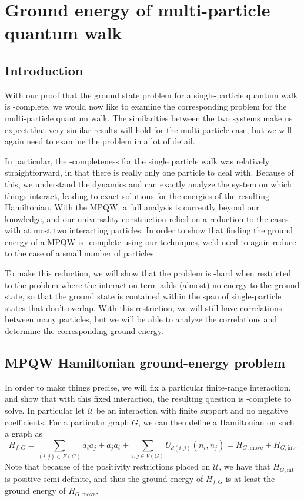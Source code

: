 \documentclass[../thesis-main/thesis-main]{subfiles}
\begin{document}
\chapter{Ground energy of multi-particle quantum walk}
\label{chap:MP_ground}

\section{Introduction}

With our proof that the ground state problem for a single-particle quantum walk is \QMA-complete, we would now like to examine the corresponding problem for the multi-particle quantum walk.  The similarities between the two systems make us expect that very similar results will hold for the multi-particle case, but we will again need to examine the problem in a lot of detail.

In particular, the \QMA-completeness for the single particle walk was relatively straightforward, in that there is really only one particle to deal with.  Because of this, we understand the dynamics and can exactly analyze the system on which things interact, leading to exact solutions for the energies of the resulting Hamiltonian.  With the MPQW, a full analysis is currently beyond our knowledge, and our universality construction relied on a reduction to the cases with at most two interacting particles.  In order to show that finding the ground energy of a MPQW is \QMA-complete using our techniques, we'd need to again reduce to the case of a small number of particles.

To make this reduction, we will show that the problem is \QMA-hard when restricted to the problem where the interaction term adds (almost) no energy to the ground state, so that the ground state is contained within the span of single-particle states that don't overlap.  With this restriction, we will still have correlations between many particles, but we will be able to analyze the correlations and determine the corresponding ground energy.

\section{MPQW Hamiltonian ground-energy problem}

In order to make things precise, we will fix a particular finite-range interaction, and show that with this fixed interaction, the resulting question is \QMA-complete to solve.  In particular let $\mathcal{U}$ be an interaction with finite support and no negative coefficients.  For a particular graph $G$, we can then define a Hamiltonian on such a graph as
\begin{equation}
H_{f,G} = \sum_{(i,j)\in E(G)} a_ia_j + a_j a_i + \sum_{i,j\in V(G)} U_{d(i,j)}(n_i,n_j) = H_{G,\text{move}} + H_{G,\text{int}}.
\end{equation}
Note that because of the positivity restrictions placed on $\mathcal{U}$, we have that $H_{G,\text{int}}$ is positive semi-definite, and thus the ground energy of $H_{f,G}$ is at least the ground energy of $H_{G,\text{move}}$.
\end{document}
